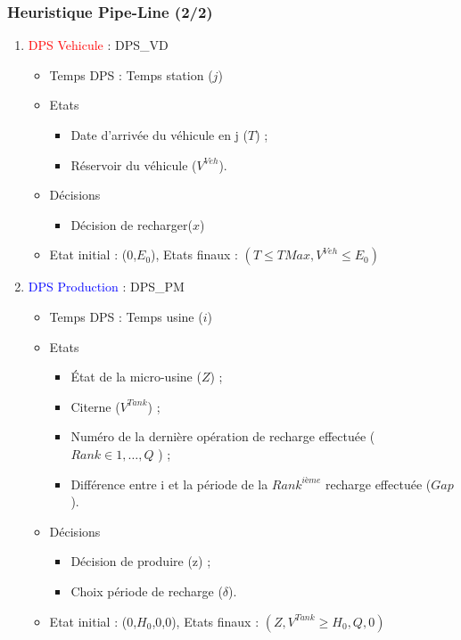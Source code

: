 \documentclass[hyperref={bookmarks=false},aspectratio=169]{beamer}
\begin{document}
\begin{frame}
	\frametitle{Heuristique Pipe-Line (2/2)}
\begin{enumerate}

\item<1-> \textcolor{red}{DPS Vehicule} : DPS\_VD

\begin{itemize}
\item Temps DPS : Temps station ($j$)
\item Etats %
\begin{itemize}
\item Date d'arrivée du véhicule en j ($T$) ;
\item Réservoir du véhicule ($V^{Veh}$).
\end{itemize}
\item Décisions %
\begin{itemize}
\item Décision de recharger($x$)
\end{itemize}

\item Etat initial : (0,$E_0$), Etats finaux : $(T\leq TMax, V^{Veh}\leq E_0)$ %
 
\end{itemize}



\item<2-> \textcolor{blue}{DPS Production} : DPS\_PM

\begin{itemize}
\item Temps DPS : Temps usine ($i$)
\item Etats %
\begin{itemize}
\item \'{E}tat de la micro-usine ($Z$) ;
\item Citerne ($V^{Tank}$) ;
\item Numéro de la dernière opération de recharge effectuée ($Rank \in {1, \dots, Q}$
) ;
\item  Différence entre i et la période de la $Rank^{ième}$ recharge effectuée ($Gap$).
\end{itemize}
\item Décisions %
\begin{itemize}
\item Décision de produire (z) ;
\item Choix période de recharge ($\delta$).
\end{itemize}
\item Etat initial : (0,$H_0$,0,0), Etats finaux : $(Z, V^{Tank}\geq H_0, Q,0)$ %

\end{itemize}

\end{enumerate}
\end{frame}
\end{document}
